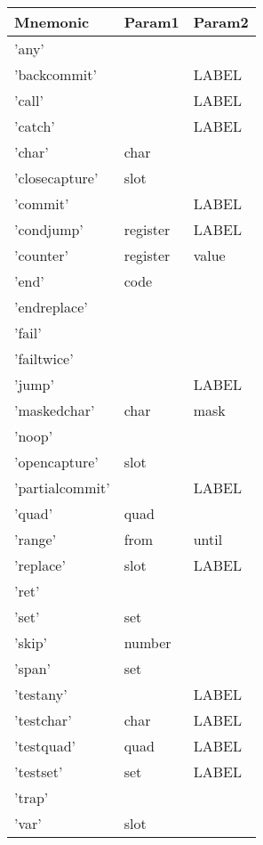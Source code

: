 
\begin{center}
\caption{Naigama Assembly Instructions}
\label{tab:naig_assembly}
\begin{longtable}{lll}
\textbf{Mnemonic} & \textbf{Param1} & \textbf{Param2} \\
\endhead
'any' &  &  \\
'backcommit' &  & LABEL \\
'call' &  & LABEL \\
'catch' &  & LABEL \\
'char' & char &  \\
'closecapture' & slot &  \\
'commit' &  & LABEL \\
'condjump' & register & LABEL \\
'counter' & register & value \\
'end' & code &  \\
'endreplace' &  &  \\
'fail' &  &  \\
'failtwice' &  &  \\
'jump' &  & LABEL \\
'maskedchar' & char & mask \\
'noop' &  &  \\
'opencapture' & slot &  \\
'partialcommit' &  & LABEL \\
'quad' & quad &  \\
'range' & from & until \\
'replace' & slot & LABEL \\
'ret' &  &  \\
'set' & set &  \\
'skip' & number &  \\
'span' & set &  \\
'testany' &  & LABEL \\
'testchar' & char & LABEL \\
'testquad' & quad & LABEL \\
'testset' & set & LABEL \\
'trap' &  &  \\
'var' & slot &  \\
\end{longtable}
\end{center}
